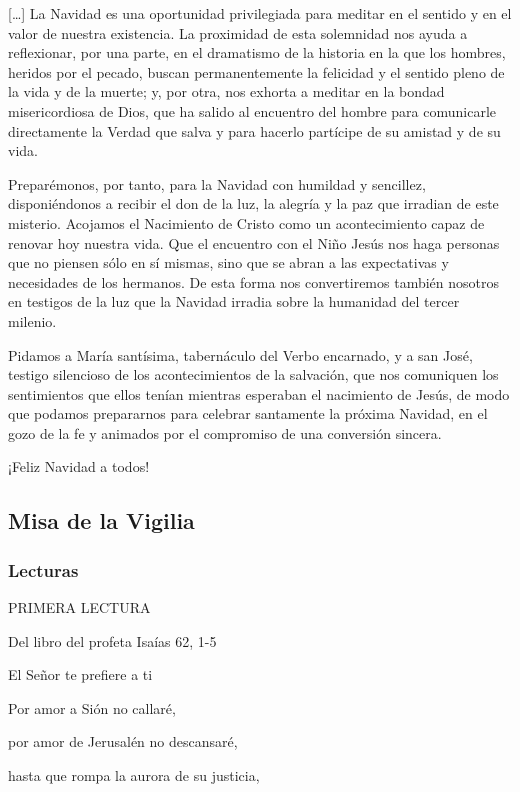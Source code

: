 \documentclass[]{article}
\begin{document}
{[}\ldots{}{]} La Navidad es una oportunidad privilegiada para meditar
en el sentido y en el valor de nuestra existencia. La proximidad de esta
solemnidad nos ayuda a reflexionar, por una parte, en el dramatismo de
la historia en la que los hombres, heridos por el pecado, buscan
permanentemente la felicidad y el sentido pleno de la vida y de la
muerte; y, por otra, nos exhorta a meditar en la bondad misericordiosa
de Dios, que ha salido al encuentro del hombre para comunicarle
directamente la Verdad que salva y para hacerlo partícipe de su amistad
y de su vida.

Preparémonos, por tanto, para la Navidad con humildad y sencillez,
disponiéndonos a recibir el don de la luz, la alegría y la paz que
irradian de este misterio. Acojamos el Nacimiento de Cristo como un
acontecimiento capaz de renovar hoy nuestra vida. Que el encuentro con
el Niño Jesús nos haga personas que no piensen sólo en sí mismas, sino
que se abran a las expectativas y necesidades de los hermanos. De esta
forma nos convertiremos también nosotros en testigos de la luz que la
Navidad irradia sobre la humanidad del tercer milenio.

Pidamos a María santísima, tabernáculo del Verbo encarnado, y a san
José, testigo silencioso de los acontecimientos de la salvación, que nos
comuniquen los sentimientos que ellos tenían mientras esperaban el
nacimiento de Jesús, de modo que podamos prepararnos para celebrar
santamente la próxima Navidad, en el gozo de la fe y animados por el
compromiso de una conversión sincera.

¡Feliz Navidad a todos!

\subsection{Misa de la Vigilia}\label{misa-de-la-vigilia}

\subsubsection{Lecturas}\label{lecturas-4}

PRIMERA LECTURA

Del libro del profeta Isaías 62, 1-5

El Señor te prefiere a ti

Por amor a Sión no callaré,

por amor de Jerusalén no descansaré,

hasta que rompa la aurora de su justicia,
\end{document}
